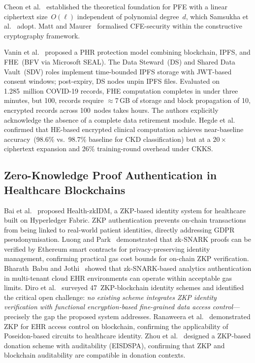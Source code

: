 \documentclass[10pt,twocolumn,a4paper]{article}
\begin{document}
Cheon et al.~\cite{cheon2020} established the theoretical foundation for PFE with a
linear ciphertext size~$O(\ell)$ independent of polynomial degree~$d$, which Samsukha
et al.~\cite{samsukha2025} adopt. Matt and Maurer~\cite{matt2015} formalised
CFE-security within the constructive cryptography framework.

Vanin et al.~\cite{vanin2023} proposed a PHR protection model combining blockchain,
IPFS, and FHE~(BFV via Microsoft SEAL). The Data Steward~(DS) and Shared Data
Vault~(SDV) roles implement time-bounded IPFS storage with JWT-based consent windows;
post-expiry, DS nodes unpin IPFS files. Evaluated on 1.285~million COVID-19 records,
FHE computation completes in under three minutes, but 100, records require
$\approx$7\,GB of storage and block propagation of 10, encrypted records across
100~nodes takes hours. The authors explicitly acknowledge the absence of a complete
data retirement module. Hegde et al.~\cite{hegde2025} confirmed that HE-based
encrypted clinical computation achieves near-baseline accuracy~(98.6\% vs.\
98.7\% baseline for CKD classification) but at a $20\times$ ciphertext expansion and
26\% training-round overhead under CKKS.

\subsection{Zero-Knowledge Proof Authentication in Healthcare Blockchains}

Bai et al.~\cite{bai2022} proposed Health-zkIDM, a ZKP-based identity system for
healthcare built on Hyperledger Fabric. ZKP authentication prevents on-chain
transactions from being linked to real-world patient identities, directly addressing
GDPR pseudonymisation. Luong and Park~\cite{luong2022} demonstrated that zk-SNARK
proofs can be verified by Ethereum smart contracts for privacy-preserving identity
management, confirming practical gas cost bounds for on-chain ZKP verification.
Bharath~Babu and Jothi~\cite{bharathbabu2024} showed that zk-SNARK-based analytics
authentication in multi-tenant cloud EHR environments can operate within acceptable
gas limits. Diro et al.~\cite{diro2024} surveyed 47~ZKP-blockchain identity schemes
and identified the critical open challenge: \emph{no existing scheme integrates ZKP
identity verification with functional encryption-based fine-grained data access
control}---precisely the gap the proposed system addresses. Ranaweera et
al.~\cite{ranaweera2023} demonstrated ZKP for EHR access control on blockchain,
confirming the applicability of Poseidon-based circuits to healthcare identity. Zhou
et al.~\cite{zhou2024} designed a ZKP-based donation scheme with auditability
(EISDSPA), confirming that ZKP and blockchain auditability are compatible in
donation contexts.
\end{document}
